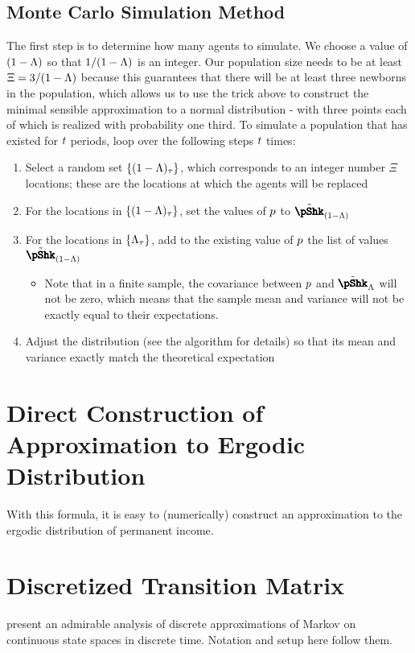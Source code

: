 \documentclass[../BufferStockTheory.tex]{subfiles}\usepackage{ApndxSteadyState}
\begin{document}
  \subsection{Monte Carlo Simulation Method}
  The first step is to determine how many agents to simulate.
  \newcommand{\popMult}{\Xi}
  We choose a value of $(1-\Lambda)$ so that $1/(1-\Lambda)$ is an integer.  Our population size needs to be at least $\popMult = 3/\Die$ because this guarantees that there will be at least three newborns in the population, which allows us to use the trick above to construct the minimal sensible approximation to a normal distribution - with three points each of which is realized with probability one third.
  To simulate a population that has existed for $t$ periods, loop over the following steps $t$ times:
  \begin{enumerate}
  \item Select a random set $\{(1-\Lambda)_{\tau}\}$, which corresponds to an integer number $\popMult$ locations; these are the locations at which the agents will be replaced 
  \item For the locations in $\{(1-\Lambda)_{\tau}\}$, set the values of $p$ to $\pShkNewRemix$
  \item For the locations in $\{\Lambda_{\tau}\}$, add to the existing value of $p$ the list of values $\pShkNewRemix$
    \begin{itemize}
    \item Note that in a finite sample, the covariance between $p$ and $\pShkOldRemix$ will not be zero, which means that the sample mean and variance will not be exactly equal to their expectations.
    \end{itemize}
\item Adjust the distribution (see the algorithm for details) so that its mean and variance exactly match the theoretical expectation    
  \end{enumerate}
  \section{Direct Construction of Approximation to Ergodic Distribution}
  With this formula, it is easy to (numerically) construct an approximation to the ergodic distribution of permanent income.
  \section{Discretized Transition Matrix}
  \cite{eaDiscretize} present an admirable analysis of discrete approximations of Markov on continuous state spaces in discrete time.  Notation and setup here follow them.
\end{document}
